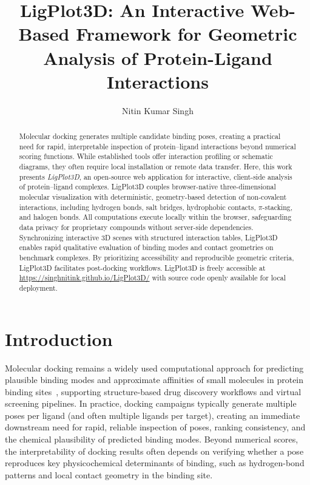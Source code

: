 \documentclass[journal=jacsat,manuscript=article]{achemso}
\author{Nitin Kumar Singh}
\affiliation[Indian Institute of Technology (IIT) Gandhinagar]
{Discipline of Chemical Engineering, Indian Institute of Technology (IIT) Gandhinagar, Palaj, Gujarat 382355, India}
\title[LigPlot3D]
  {LigPlot3D: An Interactive Web-Based Framework for Geometric Analysis of Protein-Ligand Interactions}
\begin{document}
\begin{abstract}
Molecular docking generates multiple candidate binding poses, creating a practical need for rapid, interpretable inspection of protein--ligand interactions beyond numerical scoring functions. While established tools offer interaction profiling or schematic diagrams, they often require local installation or remote data transfer. Here, this work presents \textit{LigPlot3D}, an open-source web application for interactive, client-side analysis of protein--ligand complexes. LigPlot3D couples browser-native three-dimensional molecular visualization with deterministic, geometry-based detection of non-covalent interactions, including hydrogen bonds, salt bridges, hydrophobic contacts, $\pi$-stacking, and halogen bonds. All computations execute locally within the browser, safeguarding data privacy for proprietary compounds without server-side dependencies. Synchronizing interactive 3D scenes with structured interaction tables, LigPlot3D enables rapid qualitative evaluation of binding modes and contact geometries on benchmark complexes. By prioritizing accessibility and reproducible geometric criteria, LigPlot3D facilitates post-docking workflows. LigPlot3D is freely accessible at \url{https://singhnitink.github.io/LigPlot3D/} with source code openly available for local deployment.
\end{abstract}


\section{Introduction}
Molecular docking remains a widely used computational approach for predicting plausible binding modes and approximate affinities of small molecules in protein binding sites~\cite{paggi2024art}, supporting structure-based drug discovery workflows and virtual screening pipelines. In practice, docking campaigns typically generate multiple poses per ligand (and often multiple ligands per target), creating an immediate downstream need for rapid, reliable inspection of poses, ranking consistency, and the chemical plausibility of predicted binding modes. Beyond numerical scores, the interpretability of docking results often depends on verifying whether a pose reproduces key physicochemical determinants of binding, such as hydrogen-bond patterns and local contact geometry in the binding site.
\end{document}

